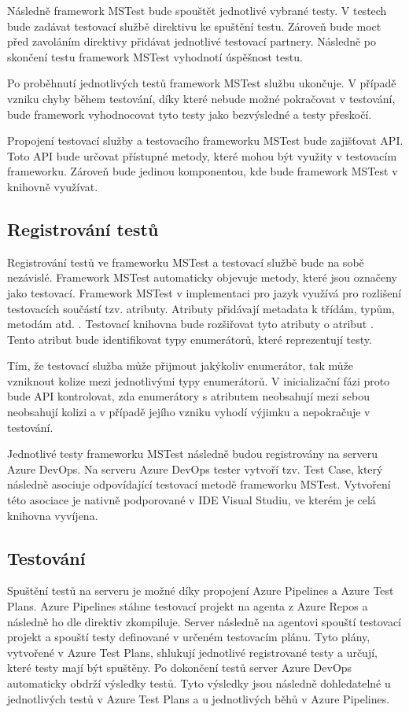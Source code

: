 Následně framework MSTest bude spouštět jednotlivé vybrané testy. V testech bude zadávat testovací službě direktivu ke spuštění testu. Zároveň bude moct před zavoláním direktivy přidávat jednotlivé testovací partnery. Následně po skončení testu framework MSTest vyhodnotí úspěšnost testu.

Po proběhnutí jednotlivých testů framework MSTest službu ukončuje. V případě vzniku chyby během testování, díky které nebude možné pokračovat v testování, bude framework vyhodnocovat tyto testy jako bezvýsledné a testy přeskočí.

Propojení testovací služby a testovacího frameworku MSTest bude zajišťovat API. Toto API bude určovat přístupné metody, které mohou být využity v testovacím frameworku. Zároveň bude jedinou komponentou, kde bude framework MSTest v knihovně využívat.

\subsection{Registrování testů}\label{sec:reg_test}
Registrování testů ve frameworku MSTest a testovací službě bude na sobě nezávislé. Framework MSTest automaticky objevuje metody, které jsou označeny jako testovací. Framework MSTest v implementaci pro jazyk \csharp{} využívá pro rozlišení testovacích součástí tzv. atributy. Atributy přidávají metadata k třídám, typům, metodám atd. \cite{attribute_docs}. Testovací knihovna bude rozšiřovat tyto atributy o atribut . Tento atribut bude identifikovat typy enumerátorů, které reprezentují testy. 

Tím, že testovací služba může přijmout jakýkoliv enumerátor, tak může vzniknout kolize mezi jednotlivými typy enumerátorů. V inicializační fázi proto bude API kontrolovat, zda enumerátory s atributem  neobsahují mezi sebou neobsahují kolizi a v případě jejího vzniku vyhodí výjimku a nepokračuje v testování.

Jednotlivé testy frameworku MSTest následně budou registrovány na serveru Azure DevOps. Na serveru Azure DevOps tester vytvoří tzv. Test Case, který následně asociuje odpovídající testovací metodě frameworku MSTest. Vytvoření této asociace je nativně podporované v IDE Visual Studiu, ve kterém je celá knihovna vyvíjena. 


\subsection{Testování}
Spuštění testů na serveru je možné díky propojení Azure Pipelines a Azure Test Plans. Azure Pipelines stáhne testovací projekt na agenta z Azure Repos a následně ho dle direktiv zkompiluje. Server následně na agentovi spouští testovací projekt a spouští testy definované v určeném testovacím plánu. Tyto plány, vytvořené v Azure Test Plans, shlukují jednotlivé registrované testy a určují, které testy mají být spuštěny. Po dokončení testů server Azure DevOps automaticky obdrží výsledky testů. Tyto výsledky jsou následně dohledatelné u jednotlivých testů v Azure Test Plans a u jednotlivých běhů v Azure Pipelines. 


